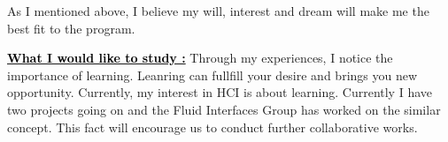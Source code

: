 \documentclass{article}
\newcommand{\statement}[1]{\par\medskip
  \underline{\textcolor{black}{\textbf{#1:}}}\space
}
\begin{document}
As I mentioned above, I believe my will, interest and dream will make me the best fit to the program.






\statement{What I would like to study } Through my experiences, I notice the importance of learning. Leanring can fullfill your desire and brings you new opportunity. Currently, my interest in HCI is about learning. Currently I have two projects going on and the Fluid Interfaces Group has worked on the similar concept. This fact will encourage us to conduct further collaborative works.
\end{document}
